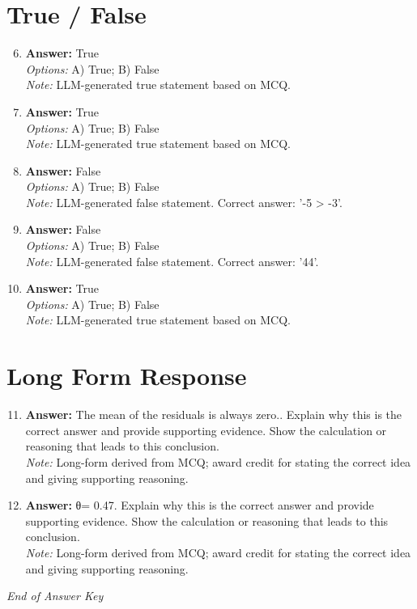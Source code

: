 \documentclass[12pt]{article}
\begin{document}
\section*{True / False}
\begin{enumerate}[label=\arabic*.]
\setcounter{enumi}{5}
\item \textbf{Answer:} True
\\ \textit{Options:} A) True; B) False
\\ \textit{Note:} LLM-generated true statement based on MCQ.
\item \textbf{Answer:} True
\\ \textit{Options:} A) True; B) False
\\ \textit{Note:} LLM-generated true statement based on MCQ.
\item \textbf{Answer:} False
\\ \textit{Options:} A) True; B) False
\\ \textit{Note:} LLM-generated false statement. Correct answer: '-5 \textgreater{} -3'.
\item \textbf{Answer:} False
\\ \textit{Options:} A) True; B) False
\\ \textit{Note:} LLM-generated false statement. Correct answer: '44'.
\item \textbf{Answer:} True
\\ \textit{Options:} A) True; B) False
\\ \textit{Note:} LLM-generated true statement based on MCQ.
\end{enumerate}

\section*{Long Form Response}
\begin{enumerate}[label=\arabic*.]
\setcounter{enumi}{10}
\item \textbf{Answer:} The mean of the residuals is always zero.. Explain why this is the correct answer and provide supporting evidence. Show the calculation or reasoning that leads to this conclusion.
\\ \textit{Note:} Long-form derived from MCQ; award credit for stating the correct idea and giving supporting reasoning.
\item \textbf{Answer:} θ= 0.47. Explain why this is the correct answer and provide supporting evidence. Show the calculation or reasoning that leads to this conclusion.
\\ \textit{Note:} Long-form derived from MCQ; award credit for stating the correct idea and giving supporting reasoning.
\end{enumerate}

\vfill
\noindent\textit{End of Answer Key}
\end{document}
